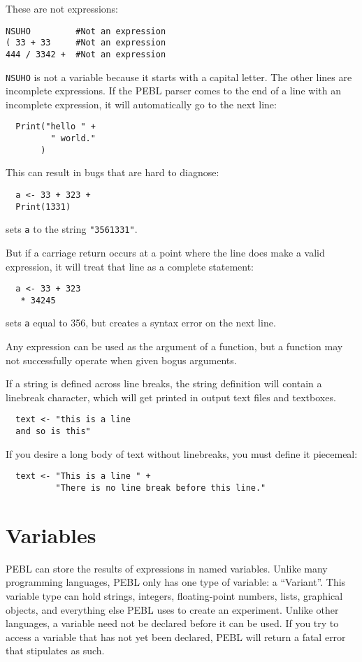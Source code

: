 These are not expressions:
\begin{verbatim}
NSUHO         #Not an expression
( 33 + 33     #Not an expression
444 / 3342 +  #Not an expression
\end{verbatim}
\texttt{NSUHO} is not a variable because it starts with a capital
letter. The other lines are incomplete expressions.  If the PEBL parser comes
to the end of a line with an incomplete expression, it
will automatically go to the next line:
\begin{verbatim}
  Print("hello " +
         " world."
       )
\end{verbatim}
This can result in bugs that are hard to diagnose:
\begin{verbatim}
  a <- 33 + 323 +
  Print(1331)
\end{verbatim}
sets \texttt{a} to the string \texttt{"3561331"}.

But if a carriage return occurs at a point where the
line does make a valid expression, it will treat that line as a complete statement:
\begin{verbatim}
  a <- 33 + 323
   * 34245
\end{verbatim}
sets \texttt{a} equal to 356, but creates a syntax error on the next line.

Any expression can be used as the argument of a function, but a
function may not successfully operate when given bogus arguments.


If a string is defined across line breaks, the string definition will
contain a linebreak character, which will get printed in output text
files and textboxes.

\begin{verbatim}
  text <- "this is a line
  and so is this"
\end{verbatim}
If you desire a long body of text without linebreaks, you must define it piecemeal:
\begin{verbatim}
  text <- "This is a line " +
          "There is no line break before this line."
\end{verbatim}




\section{Variables}

PEBL can store the results of expressions in
named variables.  Unlike many programming languages, PEBL
only has one type of variable: a ``Variant''. This variable
type can hold strings, integers, floating-point numbers, lists,
graphical objects, and everything else PEBL uses to create an
experiment.  Unlike other languages, a variable need not be
declared before it can be used.  If you try to access a variable that
has not yet been declared, PEBL will return a fatal error that stipulates as such.


